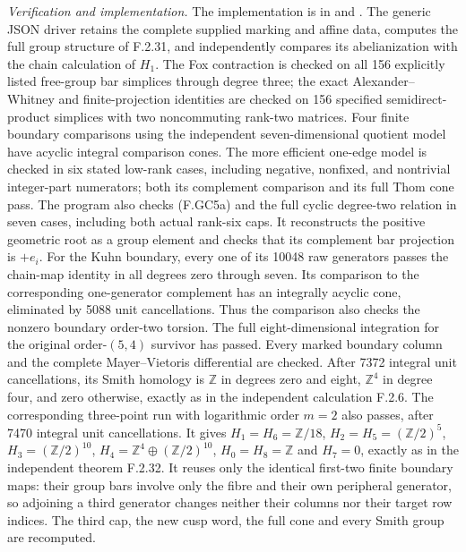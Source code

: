 \emph{Verification and implementation.}
The implementation is in 
and .
The generic JSON driver 
retains the complete supplied marking and affine data, computes
the full group structure of F.2.31, and independently compares
its abelianization with the chain calculation of $H_1$.
The Fox contraction is checked on all 156 explicitly listed
free-group bar simplices through degree three; the exact
Alexander--Whitney and finite-projection identities are
checked on 156 specified semidirect-product simplices with
two noncommuting rank-two matrices.
Four finite boundary comparisons using the independent
seven-dimensional quotient model have acyclic integral
comparison cones.  The more efficient one-edge model is
checked in six stated low-rank cases, including negative,
nonfixed, and nontrivial integer-part numerators; both its
complement comparison and its full Thom cone pass.
The program  also
checks (F.GC5a) and the full cyclic degree-two relation in
seven cases, including both actual rank-six caps.  It
reconstructs the positive geometric root as a group element
and checks that its complement bar projection is $+e_i$.
For the Kuhn boundary, every one of its 10048 raw generators
passes the chain-map identity in all degrees zero through
seven.  Its comparison to the corresponding one-generator
complement has an integrally acyclic cone, eliminated by
5088 unit cancellations.  Thus the comparison also checks
the nonzero boundary order-two torsion.
The full eight-dimensional integration for the original
order-$(5,4)$ survivor has passed.  Every marked boundary
column and the complete Mayer--Vietoris differential are
checked.  After 7372 integral unit cancellations, its Smith
homology is $\mathbb Z$ in degrees zero and eight,
$\mathbb Z^4$ in degree four, and zero otherwise, exactly
as in the independent calculation F.2.6.
The corresponding three-point run with logarithmic order
$m=2$ also passes, after 7470 integral unit cancellations.
It gives $H_1=H_6=\mathbb Z/18$,
$H_2=H_5=(\mathbb Z/2)^5$, $H_3=(\mathbb Z/2)^{10}$,
$H_4=\mathbb Z^4\oplus(\mathbb Z/2)^{10}$,
$H_0=H_8=\mathbb Z$ and $H_7=0$, exactly as in the
independent theorem F.2.32.  It reuses only the identical
first-two finite boundary maps: their group bars involve only
the fibre and their own peripheral generator, so adjoining
a third generator changes neither their columns nor their
target row indices.  The third cap, the new cusp word,
the full cone and every Smith group are recomputed.


